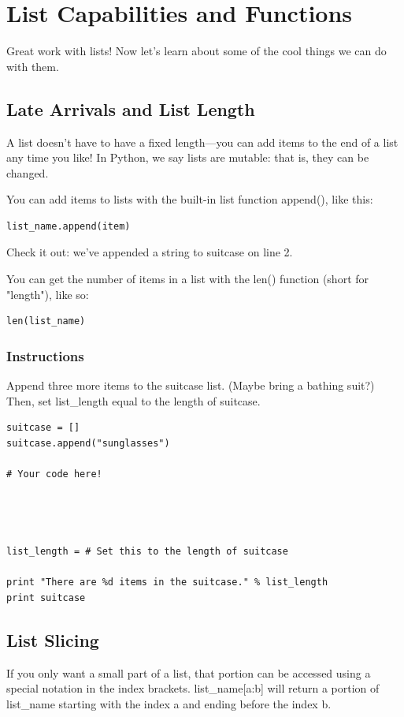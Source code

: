 \documentclass[12pt,a4paper,final,twoside,onecolumn,titlepage]{book}
\begin{document}
\section{List Capabilities and Functions}
Great work with lists! Now let's learn about some of the cool things we can do with them.

\subsection{Late Arrivals and List Length}
A list doesn't have to have a fixed length—you can add items to the end of a list any time you like! In Python, we say lists are mutable: that is, they can be changed.

You can add items to lists with the built-in list function append(), like this:
\begin{lstlisting}
list_name.append(item)
\end{lstlisting}
Check it out: we've appended a string to suitcase on line 2.

You can get the number of items in a list with the len() function (short for "length"), like so:
\begin{lstlisting}
len(list_name)
\end{lstlisting}
\subsubsection{Instructions}

Append three more items to the suitcase list. (Maybe bring a bathing suit?) Then, set list\_length equal to the length of suitcase.

\begin{lstlisting}
suitcase = [] 
suitcase.append("sunglasses")

# Your code here!




list_length = # Set this to the length of suitcase

print "There are %d items in the suitcase." % list_length
print suitcase
\end{lstlisting}

\subsection{List Slicing}

If you only want a small part of a list, that portion can be accessed using a special notation in the index brackets. list\_name[a:b] will return a portion of list\_name starting with the index a and ending before the index b.
\end{document}
